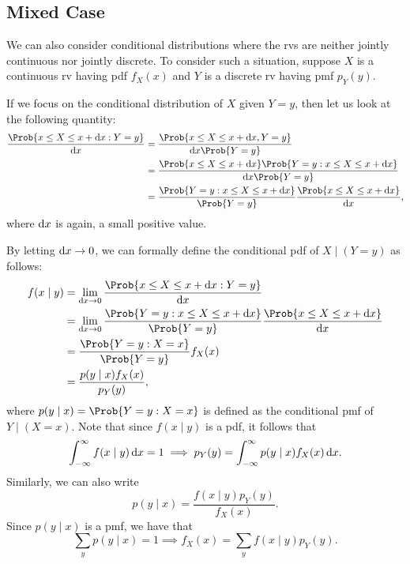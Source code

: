 \subsection*{Mixed Case}
\begin{Regular}
    We can also consider conditional distributions where the rvs are neither jointly continuous nor
    jointly discrete. To consider such a situation, suppose $X$ is a continuous rv having pdf $ f_X(x) $
    and $Y$ is a discrete rv having pmf $ p_Y(y) $.

    If we focus on the conditional distribution of $ X $ given $ Y=y $, then let us look at the following quantity:
    \begin{align*}
        \frac{\Prob{x\le X\le x+\odif{x}\given Y=y}}{\odif{x}}
         & =\frac{\Prob{x\le X\le x+\odif{x},Y=y}}{\odif{x}\Prob{Y=y}}                                            \\
         & = \frac{\Prob{x\le X\le x+\odif{x}}\Prob{Y=y\given x\le X\le x+\odif{x}}}{\odif{x}\Prob{Y=y}}          \\
         & =\frac{\Prob{Y=y\given x\le X\le x+\odif{x}}}{\Prob{Y=y}}\frac{\Prob{x\le X\le x+\odif{x}}}{\odif{x}},
    \end{align*}
    where $ \odif{x} $ is again, a small positive value.

    By letting $ \odif{x}\to 0 $, we can formally define the conditional pdf of $ X\mid(Y=y) $ as follows:
    \begin{align*}
        f(x\mid y)
         & =\lim\limits_{{\odif{x}} \to {0}} \frac{\Prob{x\le X\le x+\odif{x}\given Y=y}}{\odif{x}}                                               \\
         & = \lim\limits_{{\odif{x}} \to {0}}\frac{\Prob{Y=y\given x\le X\le x+\odif{x}}}{\Prob{Y=y}}\frac{\Prob{x\le X\le x+\odif{x}}}{\odif{x}} \\
         & =\frac{\Prob{Y=y\given X=x}}{\Prob{Y=y}} f_X(x)                                                                                        \\
         & =\frac{p(y\mid x)f_X(x)}{p_Y(y)},
    \end{align*}
    where $ p(y\mid x)=\Prob{Y=y\given X=x} $ is defined as the conditional pmf of $ Y\mid(X=x) $. Note that
    since $ f(x\mid y) $ is a pdf, it follows that
    \[ \int_{-\infty}^{\infty}f(x\mid y)\odif{x} =1\implies p_Y(y)=\int_{-\infty}^{\infty}p(y\mid x)f_X(x)\odif{x}. \]
    Similarly, we can also write
    \[ p(y\mid x)=\frac{f(x\mid y)p_Y(y)}{f_X(x)}. \]
    Since $ p(y\mid x) $ is a pmf, we have that
    \[ \sum_y p(y\mid x)=1\implies f_X(x)=\sum_y f(x\mid y)p_Y(y). \]
\end{Regular}
